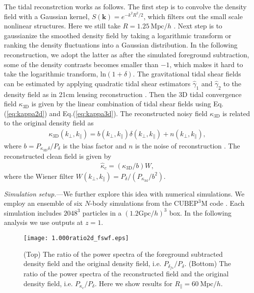 \documentclass[aps,prl,twocolumn,showpacs,superscriptaddress,groupedaddress,nofootinbib]{revtex4}  %
\newcommand{\mr}{\mathrm}
\begin{document}
The tidal reconstrction works as follows. The first step is to convolve
the density field with a Gaussian kernel, $S(\bm{k})=e^{-k^2R^2/2}$, which
filters out the small scale nonlinear structures.
Here we still take $R=1.25\ \mr{Mpc}/h$ \cite{2012:pen}\cite{2015:zhu}.
Next step is to gaussianize the smoothed density field by taking a logarithmic
transform or ranking the density fluctuations into a Gaussian distribution.
In the following reconstruction, we adopt the latter as after the simulated
foreground subtraction, some of the density contrasts becomes smaller than $-1$,
which makes it hard to take the logarithmic transform, $\mathrm{ln}(1+\delta)$.
The gravitational tidal shear fields can be estimated by applying quadratic 
tidal shear estimators $\hat{\gamma}_1$ and $\hat{\gamma}_2$ to the density 
field as in 21cm lensing reconstruction \cite{2008:lu}. 
Then the 3D tidal convergence field $\kappa_\mr{3D}$ is given by the linear 
combination of tidal shear fields using Eq.(\ref{eq:kappa2d}) and 
Eq.(\ref{eq:kappa3d}).
The reconstructed noisy field $\kappa_\mr{3D}$ is related to the original 
density field as 
\begin{eqnarray}
\kappa_\mr{3D}(k_\perp,k_\parallel)=b(k_\perp,k_\parallel)
\delta(k_\perp,k_\parallel)+n(k_\perp,k_\parallel),
\end{eqnarray}
where $b=P_{\kappa_\mr{3D}\delta}/P_{\delta}$ is the bias factor and $n$ is 
the noise of reconstruction \cite{2015:zhu}. 
The reconstructed clean field is given by 
\begin{eqnarray}
\label{eq:kapc}
\hat{\kappa}_c=({\kappa_\mr{3D}}/{b})W,
\end{eqnarray}
where the Wiener filter $W(k_\perp,k_\parallel)=
P_\delta/(P_{\kappa_\mr{3d}}/b^2)$.

{\it Simulation setup.}---We further explore this idea with numerical 
simulations. We employ an ensemble of six $N$-body simulations from the
$\mr{CUBEP}^3\mr{M}$ code \cite{2013:code}. 
Each simulation includes $2048^3$ particles in a $(1.2\mr{Gpc}/h)^3$ box. 
In the following analysis we use outputs at $z=1$.

\begin{figure}[tbp]
\begin{center}
\texttt{[image: 1.000ratio2d\_fswf.eps]}
\end{center}
\vspace{-0.7cm}
\caption{(Top) The ratio of the power spectra of the 
foreground subtracted density field and the original density field, i.e. 
$P_{\delta_{fs}}/P_\delta$. 
(Bottom) The ratio of the power spectra of the reconstructed 
field and the original density field, i.e. $P_{\kappa_c}/P_\delta$.
Here we show results for $R_\parallel=60\ \mr{Mpc}/h$.}
\label{fig:ratio}
\end{figure}
\end{document}

